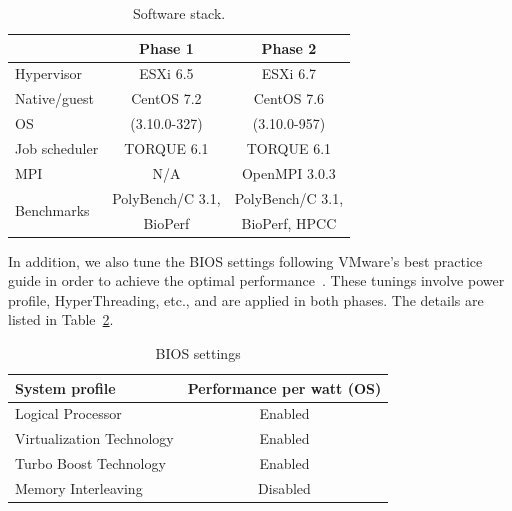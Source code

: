 \begin{table}[!h]\small
  \caption{Software stack.}
  \centering
    \begin{tabular}{|l|c|c|}
    \hline
     & Phase 1 & Phase 2 \\
    \hline
    Hypervisor & ESXi 6.5 & ESXi 6.7 \\
    \hline
    Native/guest  & CentOS 7.2 & CentOS 7.6 \\
         OS       & (3.10.0-327) & (3.10.0-957) \\
    \hline
    Job scheduler & TORQUE 6.1 & TORQUE 6.1 \\
    \hline
    MPI & N/A & OpenMPI 3.0.3 \\
    \hline
    \multirow{2}{*}{Benchmarks} & PolyBench/C 3.1,  &  PolyBench/C 3.1,  \\
                                & BioPerf & BioPerf, HPCC \\  
    \hline
    \end{tabular}
  \label{tbl:software}
\end{table}

In addition, we also tune the BIOS settings following VMware's best practice 
guide in order to achieve the optimal performance~\cite{hpc2018best}. These tunings involve 
power profile, HyperThreading, etc., and are applied in both phases. The details are listed in Table~\ref{tbl:bios}.

\begin{table}[!h]\small
  \caption{BIOS settings}
  \centering
    \begin{tabular}{|l|c|}
    \hline
    System profile & Performance per watt (OS) \\
    \hline
    Logical Processor  & Enabled \\
    \hline
    Virtualization Technology & Enabled \\
    \hline
    Turbo Boost Technology & Enabled \\
    \hline
    Memory Interleaving & Disabled \\
    \hline
    \end{tabular}
  \label{tbl:bios}
\end{table}


